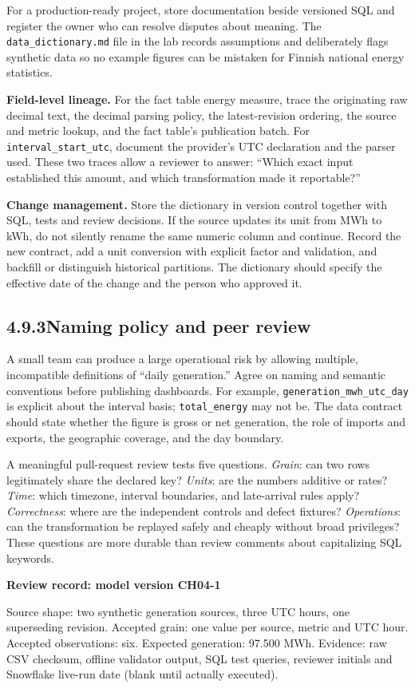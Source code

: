 \documentclass[11pt,twoside]{article}
\newcommand{\topic}[2]{\subsection*{#1\quad #2}}
\begin{document}
For a production-ready project, store documentation beside versioned SQL and register the owner who can resolve disputes about meaning. The \texttt{data\_dictionary.md} file in the lab records assumptions and deliberately flags synthetic data so no example figures can be mistaken for Finnish national energy statistics.


\textbf{Field-level lineage.} For the fact table energy measure, trace the originating raw decimal text, the decimal parsing policy, the latest-revision ordering, the source and metric lookup, and the fact table's publication batch. For \texttt{interval\_start\_utc}, document the provider's UTC declaration and the parser used. These two traces allow a reviewer to answer: ``Which exact input established this amount, and which transformation made it reportable?''\par
\textbf{Change management.} Store the dictionary in version control together with SQL, tests and review decisions. If the source updates its unit from MWh to kWh, do not silently rename the same numeric column and continue. Record the new contract, add a unit conversion with explicit factor and validation, and backfill or distinguish historical partitions. The dictionary should specify the effective date of the change and the person who approved it.

\newpage
\topic{4.9.3}{Naming policy and peer review}
A small team can produce a large operational risk by allowing multiple, incompatible definitions of ``daily generation.'' Agree on naming and semantic conventions before publishing dashboards. For example, \texttt{generation\_mwh\_utc\_day} is explicit about the interval basis; \texttt{total\_energy} may not be. The data contract should state whether the figure is gross or net generation, the role of imports and exports, the geographic coverage, and the day boundary.

A meaningful pull-request review tests five questions. \emph{Grain}: can two rows legitimately share the declared key? \emph{Units}: are the numbers additive or rates? \emph{Time}: which timezone, interval boundaries, and late-arrival rules apply? \emph{Correctness}: where are the independent controls and defect fixtures? \emph{Operations}: can the transformation be replayed safely and cheaply without broad privileges? These questions are more durable than review comments about capitalizing SQL keywords.

\begin{whitebox}\textbf{Review record: model version CH04-1}\par
Source shape: two synthetic generation sources, three UTC hours, one superseding revision. Accepted grain: one value per source, metric and UTC hour. Accepted observations: six. Expected generation: 97.500 MWh. Evidence: raw CSV checksum, offline validator output, SQL test queries, reviewer initials and Snowflake live-run date (blank until actually executed).\end{whitebox}
\end{document}
